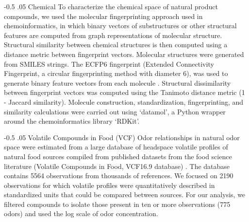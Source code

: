 \documentclass[12pt]{caltech_thesis}
\makeatletter
\renewcommand{\cite}{{ }\autocite}
\let\Oldsubsubsection\subsubsection
\renewcommand{\subsubsection}{\FloatBarrier\Oldsubsubsection}
\renewcommand\subsubsection{%
    \@startsection{subsubsection}{4}{0mm}%
       {-0.5\baselineskip}%
       {.05\baselineskip}%
       {\normalfont\normalsize\bfseries\itshape}}
\makeatother
\begin{document}
\begin{refsection}
\subsubsection{Chemical}
To characterize the chemical space of natural product compounds, we used the molecular fingerprinting approach used in chemoinformatics, in which binary vectors of substructures or other structural features are computed from graph representations of molecular structure.
Structural similarity between chemical structures is then computed using a distance metric between fingerprint vectors.
Molecular structures were generated from SMILES strings.
The ECFP6 fingerprint (Extended Connectivity Fingerprint, a circular fingerprinting method with diameter 6), was used to generate binary feature vectors from each molecule\cite{ECFP}.
Structural dissimilarity between fingerprint vectors was computed using the Tanimoto distance metric (1 - Jaccard similarity).
Molecule construction, standardization, fingerprinting, and similarity calculations were carried out using `datamol', a Python wrapper around the chemoinformatics library `RDKit'. 

\subsubsection{Volatile Compounds in Food (VCF)}
Odor relationships in natural odor space were estimated from a large database of headspace volatile profiles of natural food sources compiled from published datasets from the food science literature (Volatile Compounds in Food, VCF16.9 database)\cite{VCF}.
The database contains \num{5564} observations from thousands of references.
We focused on \num{2190} observations for which volatile profiles were quantitatively described in standardized units that could be compared between sources.
For our analysis, we filtered compounds to isolate those present in ten or more observations (775 odors) and used the log scale of odor concentration.


\end{refsection}
\end{document}
